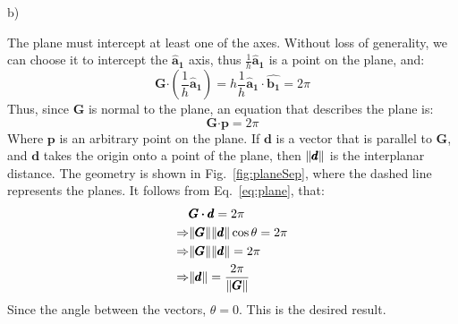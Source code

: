 \documentclass[a4paper,12pt]{article}
\newcommand{\af}{\pmb{\hat a_1}}
\newcommand\uv[1]{\pmb{\hat {#1}}}
\newcommand\dprod{\pmb{\cdot}}
\begin{document}
\begin{minipage}[t]{0.9\textwidth}
  b)
  \begin{minipage}[t]{\textwidth}
    The plane must intercept at least one of the axes.
    Without loss of generality, we can choose it to intercept the $\af$ axis, thus $\frac{1}{h} \af$ is a point on the plane, and:
    \begin{equation*}
      \pmb{G} \dprod \left(\frac{1}{h}\af\right) = h \frac{1}{h} \af \cdot \uv{b_1} = 2 \pi
    \end{equation*}
    Thus, since $\pmb{G}$ is normal to the plane, an equation that describes the plane is:
    \begin{equation}
      \pmb{G} \dprod \pmb{p} = 2 \pi
      \label{eq:plane}
    \end{equation} 
    Where $\pmb{p}$ is an arbitrary point on the plane.
    If $\pmb{d}$ is a vector that is parallel to $\pmb{G}$, and $\pmb{d}$ takes the origin onto a point of the plane, then $\norm{\pmb{d}}$ is the interplanar distance.
    The geometry is shown in Fig.~\ref{fig:planeSep}, where the dashed line represents the planes. 
    It follows from Eq.~\ref{eq:plane}, that:
    \begin{align*}
                 & \pmb{G} \dprod \pmb{d} = 2 \pi\\
      \Rightarrow & \norm{\pmb{G}} \norm{\pmb{d}} \cos \theta = 2 \pi\\
      \Rightarrow & \norm{\pmb{G}} \norm{\pmb{d}} = 2 \pi\\
      \Rightarrow & \norm{\pmb{d}} = \frac{2 \pi}{\norm{\pmb{G}}}
    \end{align*}
    Since the angle between the vectors, $\theta = 0$.
    This is the desired result.
  \end{minipage}
\end{minipage}
$\phantom{1.}$
\end{document}
